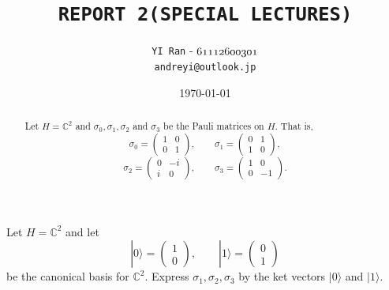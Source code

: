 \documentclass[dvipdfmx,a4paper]{jsarticle}
\title{\vspace{-3cm} \textbf{\texttt{REPORT 2(SPECIAL LECTURES)}}}
\author{\texttt{YI Ran} - $\mathnormal{61112600301}$\\ \texttt{andreyi@outlook.jp}}
\date{\today}
\theoremstyle{mystyle}
\begin{document}
\maketitle
\thispagestyle{plain}

\begin{abstract} %
  \noindent
\textrm{Let $H=\mathbb{C}^2$ and $\sigma_0,\sigma_1,\sigma_2$ and $\sigma_3$ be the Pauli matrices on $H$.
That is,}
\[
\sigma_0=
\begin{pmatrix}
1 & 0\\
0 & 1
\end{pmatrix},
\qquad
\sigma_1=
\begin{pmatrix}
0 & 1\\
1 & 0
\end{pmatrix},
\]
\[
\sigma_2=
\begin{pmatrix}
0 & -i\\
i & 0
\end{pmatrix},
\qquad
\sigma_3=
\begin{pmatrix}
1 & 0\\
0 & -1
\end{pmatrix}.
\]
\end{abstract}

\section*{}

\textrm{Let $H=\mathbb{C}^2$ and let
\[
|0\rangle=
\begin{pmatrix}
1\\
0
\end{pmatrix},
\qquad
|1\rangle=
\begin{pmatrix}
0\\
1
\end{pmatrix}
\]
be the canonical basis for $\mathbb{C}^2$.
Express $\sigma_1,\sigma_2,\sigma_3$ by the ket vectors $|0\rangle$ and $|1\rangle$.}

\vspace{1em}

\section*{}
\end{document}
